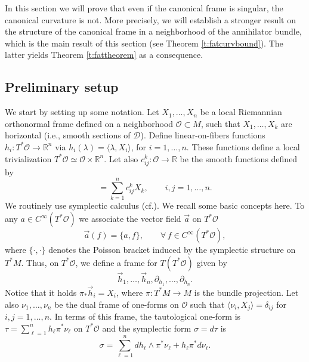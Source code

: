 \documentclass[11pt,a4paper]{article}
\theoremstyle{plain}
\theoremstyle{definition}
\theoremstyle{remark}
\numberwithin{equation}{section}
\newcommand{\R}{\mathbb{R}} %
\newcommand{\distr}{\mathscr{D}}
\begin{document}
In this section we will prove that even if the canonical frame is singular, the canonical curvature is not. More precisely, we will establish a stronger result on the structure of the canonical frame in a neighborhood of the annihilator bundle, which is the main result of this section (see Theorem \ref{t:fatcurvbound}). The latter yields Theorem \ref{t:fattheorem} as a consequence.


\subsection{Preliminary setup}\label{sec:preliminary}
We start by setting up some notation. Let $X_1,\dots,X_n$ be a local Riemannian orthonormal frame defined on a neighborhood $\mathcal{O}\subset M$, such that $X_1,\dots,X_k$ are horizontal (i.e., smooth sections of $\distr$). Define linear-on-fibers functions $h_i: T^*\mathcal{O} \to \R^n$ via $h_i(\lambda) = \langle\lambda,X_i\rangle$, for $i=1,\dots,n$. These functions define a local trivialization $T^*\mathcal{O} \simeq \mathcal{O}\times \R^n$. Let also $c_{ij}^k : \mathcal{O}\to \R$ be the smooth functions defined by
\begin{equation}
[X_i,X_j] = \sum_{k=1}^n c_{ij}^k X_k, \qquad i,j=1,\dots,n.
\end{equation}
We routinely use symplectic calculus (cf.\@ \cite[Ch.\@ 4]{nostrolibro}). We recall some basic concepts here. To any $a \in C^\infty(T^*\mathcal{O})$ we associate the vector field $\vec{a}$ on $T^*\mathcal{O}$ 
\begin{equation}
\vec{a}(f) = \{a,f\}, \qquad \forall\, f \in C^\infty(T^*\mathcal{O}),
\end{equation}
where $\{\cdot,\cdot\}$ denotes the Poisson bracket induced by the symplectic structure on $T^*M$. Thus, on $T^*\mathcal{O}$, we define a frame for $T(T^*\mathcal{O})$ given by
\begin{equation}\label{eq:frame}
\vec{h}_1,\dots , \vec{h}_n,\partial_{h_1},\dots,\partial_{h_n}.
\end{equation}
Notice that it holds $\pi_* \vec{h}_i = X_i$, where $\pi :T^*M \to M$ is the bundle projection. Let also $\nu_1,\dots,\nu_n$ be the dual frame of one-forms on $\mathcal{O}$ such that $\langle \nu_i,X_j\rangle=\delta_{ij}$ for $i,j=1,\dots,n$. In terms of this frame, the tautological one-form is $\tau = \sum_{\ell=1}^n h_\ell \pi^*\nu_\ell$ on $T^*\mathcal{O}$ and the symplectic form $\sigma = d\tau$ is
\begin{equation}
\sigma = \sum_{\ell=1}^n dh_\ell \wedge \pi^*\nu_\ell + h_\ell \pi^* d\nu_\ell.
\end{equation}
\end{document}
